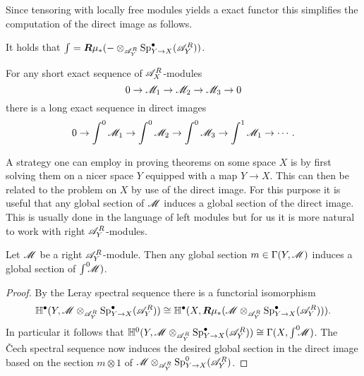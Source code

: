    Since tensoring with locally free modules yields a exact functor this simplifies the computation of the direct image as follows.
    \begin{corollary}
        It holds that $\int = \boldsymbol{R}\mu_* ({-}\otimes_{\mathscr{A}_Y^R} \operatorname{Sp}_{Y\to X}^\bullet(\mathscr{A}_Y^R))$.
    \end{corollary}
    \begin{proposition}
        For any short exact sequence of $\mathscr{A}_X^R$-modules
        $$0\to \mathscr{M}_1 \to \mathscr{M}_2 \to \mathscr{M}_3 \to 0$$
        there is a long exact sequence in direct images
        $$0\to \int^0 \mathscr{M}_1 \to \int^0 \mathscr{M}_2 \to \int^0 \mathscr{M}_3 \to \int^1 \mathscr{M}_1 \to \cdots. $$
    \end{proposition}
    A strategy one can employ in proving theorems on some space $X$ is by first solving them on a nicer space $Y$ equipped with a map $Y\to X$. This can then be related to the problem on $X$ by use of the direct image. For this purpose it is useful that any global section of $\mathscr{M}$ induces a global section of the direct image. This is usually done in the language of left modules but for us it is more natural to work with right $\mathscr{A}_Y^R$-modules.
    \begin{lemma}\label{lem: GlobalSectionDirectImage}
        Let $\mathscr{M}$ be a right $\mathscr{A}_Y^R$-module. Then any global section $m\in\Gamma(Y,\mathscr{M})$ induces a global section of $\int^0 \mkern -8mu\mathscr{M})$.
    \end{lemma}
    \begin{proof}
      By the Leray spectral sequence there is a functorial isomorphism
      $$\mathbb{H}^\bullet(Y,\mathscr{M}\otimes_{\mathscr{A}_Y^R} \operatorname{Sp}_{Y\to X}^\bullet(\mathscr{A}_Y^R)) \cong \mathbb{H}^\bullet(X,\boldsymbol{R}\mu_*(\mathscr{M}\otimes_{\mathscr{A}_Y^R} \operatorname{Sp}_{Y\to X}^\bullet(\mathscr{A}_Y^R))).$$
      In particular it follows that $\mathbb{H}^0(Y,\mathscr{M} \otimes_{\mathscr{A}_Y^R} \operatorname{Sp}_{Y\to X}^\bullet(\mathscr{A}_Y^R)) \cong \Gamma(X,\int^0 \mkern -8mu\mathscr{M})$. The \v Cech spectral sequence now induces the desired global section in the direct image based on the section $m\otimes 1$ of $\mathscr{M} \otimes_{\mathscr{A}_Y^R}\operatorname{Sp}_{Y\to X}^0(\mathscr{A}_Y^R)$.
    \end{proof}

